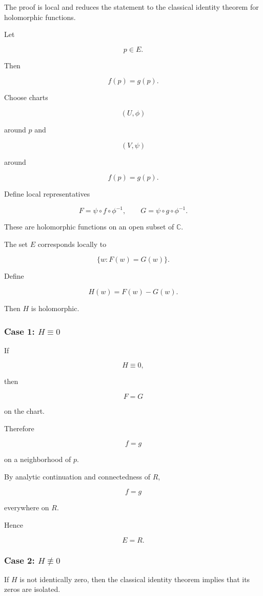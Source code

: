 \documentclass[12pt,a4paper]{article}
\theoremstyle{notespace}
\begin{document}
The proof is local and reduces the statement to the classical identity theorem for holomorphic functions.

Let

\[
p\in E.
\]

Then

\[
f(p)=g(p).
\]

Choose charts

\[
(U,\phi)
\]

around \(p\) and

\[
(V,\psi)
\]

around

\[
f(p)=g(p).
\]

Define local representatives

\[
F
=
\psi\circ f\circ\phi^{-1},
\qquad
G
=
\psi\circ g\circ\phi^{-1}.
\]

These are holomorphic functions on an open subset of \(\mathbb C\).

The set \(E\) corresponds locally to

\[
\{w:F(w)=G(w)\}.
\]

Define

\[
H(w)=F(w)-G(w).
\]

Then \(H\) is holomorphic.

\subsubsection*{Case 1: \(H\equiv0\)}

If

\[
H\equiv0,
\]

then

\[
F=G
\]

on the chart.

Therefore

\[
f=g
\]

on a neighborhood of \(p\).

By analytic continuation and connectedness of \(R\),

\[
f=g
\]

everywhere on \(R\).

Hence

\[
E=R.
\]

\subsubsection*{Case 2: \(H\not\equiv0\)}

If \(H\) is not identically zero, then the classical identity theorem implies that its zeros are isolated.
\end{document}
